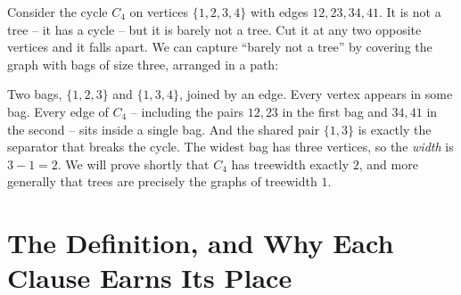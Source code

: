 Consider the cycle $C_4$ on vertices $\{1,2,3,4\}$ with edges $12,23,34,41$. It
is not a tree -- it has a cycle -- but it is barely not a tree. Cut it at any two
opposite vertices and it falls apart. We can capture ``barely not a tree'' by
covering the graph with bags of size three, arranged in a path:

\begin{center}
\end{center}

Two bags, $\{1,2,3\}$ and $\{1,3,4\}$, joined by an edge. Every vertex appears in
some bag. Every edge of $C_4$ -- including the pairs $12,23$ in the first bag and
$34,41$ in the second -- sits inside a single bag. And the shared pair $\{1,3\}$
is exactly the separator that breaks the cycle. The widest bag has three vertices,
so the \emph{width} is $3-1=2$. We will prove shortly that $C_4$ has treewidth
exactly $2$, and more generally that trees are precisely the graphs of treewidth
$1$.

\section{The Definition, and Why Each Clause Earns Its Place}
\label{ch24:defs}


